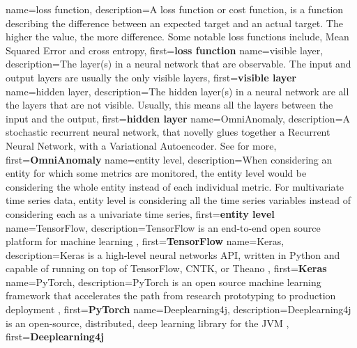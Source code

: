 {
    name=loss function,
    description={A loss function or cost function, is a function describing the difference between an expected target and an actual target. The higher the value, the more difference. Some notable loss functions include, Mean Squared Error and cross entropy},
    first={\textbf{loss function}}
}
{
    name=visible layer,
    description={The layer(s) in a neural network that are observable. The input and output layers are usually the only visible layers},
    first={\textbf{visible layer}}
}
{
    name=hidden layer,
    description={The hidden layer(s) in a neural network are all the layers that are not visible. Usually, this means all the layers between the input and the output},
    first={\textbf{hidden layer}}
}
{
    name=OmniAnomaly,
    description={A stochastic recurrent neural network, that novelly glues together a Recurrent Neural Network, with a Variational Autoencoder. See \cite{kdd} for more},
    first={\textbf{OmniAnomaly}}
}
{
    name=entity level,
    description={When considering an entity for which some metrics are monitored, the entity level would be considering the whole entity instead of each individual metric. For multivariate time series data, entity level is considering all the time series variables instead of considering each as a univariate time series},
    first={\textbf{entity level}}
}
{
    name=TensorFlow,
    description={TensorFlow is an end-to-end open source platform for machine learning  \cite{TensorFlow}},
    first={\textbf{TensorFlow}}
}
{
    name=Keras,
    description={Keras is a high-level neural networks API, written in Python and capable of running on top of TensorFlow, CNTK, or Theano \cite{Keras}},
    first={\textbf{Keras}}
}
{
    name=PyTorch,
    description={PyTorch is an open source machine learning framework that accelerates the path from research prototyping to production deployment \cite{PyTorch}},
    first={\textbf{PyTorch}}
}
{
    name=Deeplearning4j,
    description={Deeplearning4j is an open-source, distributed, deep learning library for the JVM \cite{dl4j}},
    first={\textbf{Deeplearning4j}}
}

